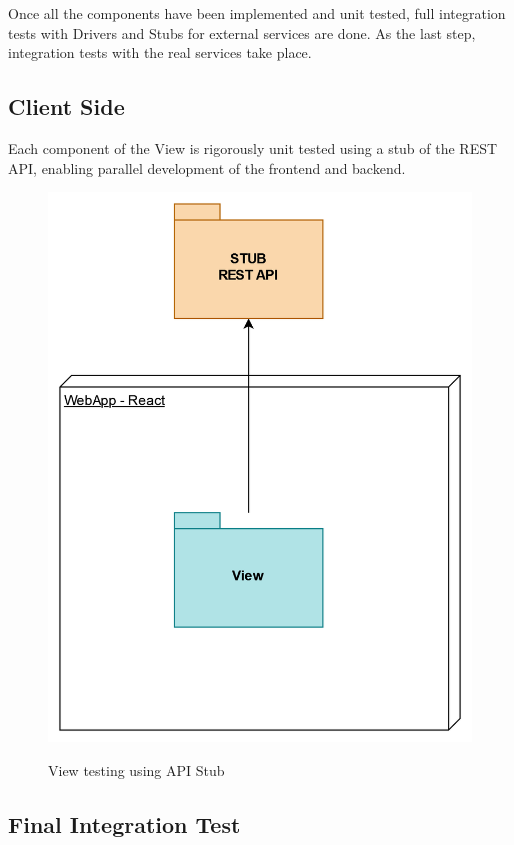 \documentclass{Configuration_Files/Template}
\begin{document}
Once all the components have been implemented and unit tested, full integration tests with Drivers and Stubs for external services are done. As the last step, integration tests with the real services take place.

\subsection{Client Side}

Each component of the View is rigorously unit tested using a stub of the REST API, enabling parallel development of the frontend and backend.

\begin{figure}[H]
\centering
\includegraphics[scale = 0.55]{Images/diagrams/ImplementationPlan_CS.png}\\
\caption{View testing using API Stub}
\end{figure}

\subsection{Final Integration Test}
\end{document}

